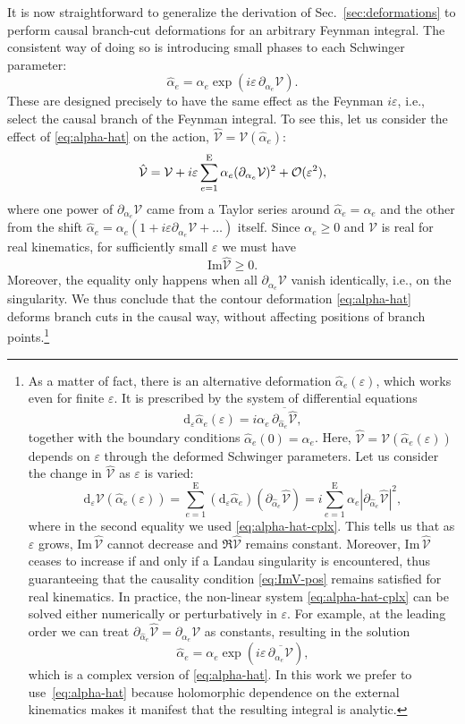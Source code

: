 \documentclass[12pt]{article}
\numberwithin{figure}{section}
\def \be {\begin{equation}}
\def \ee {\end{equation}}
\def \E {\mathrm{E}}
\def \d {\mathrm{d}}
\def \eps {\varepsilon}
\def \V {\mathcal{V}}
\def \geq {\geqslant}
\def \Im {\mathrm{Im}}
\begin{document}
	It is now straightforward to generalize the derivation of Sec.~\ref{sec:deformations} to perform causal branch-cut deformations for an arbitrary Feynman integral. The consistent way of doing so is introducing small phases to each Schwinger parameter:
	\be\label{eq:alpha-hat}
	\hat{\alpha}_e = \alpha_e \exp\left( i\eps\, \partial_{\alpha_e} \V \right).
	\ee
	These are designed precisely to have the same effect as the Feynman $i\eps$, i.e., select the causal branch of the Feynman integral. To see this, let us consider the effect of \eqref{eq:alpha-hat} on the action, $\hat{\V} = \V(\hat{\alpha}_e)$: 
	\be
	\hat{\V} = \V + i\eps \sum_{e=1}^{\E} \alpha_e (\partial_{\alpha_e} \V)^2 + {\cal O}(\eps^2),
	\ee
	where one power of $\partial_{\alpha_e}\V$ came from a Taylor series around $\hat{\alpha}_e = \alpha_e$ and the other from the shift $\hat{\alpha}_e = \alpha_e (1+ i\eps \partial_{\alpha_e} \V + \ldots)$ itself. Since $\alpha_e \geq 0$ and $\V$ is real for real kinematics, for sufficiently small $\eps$ we must have
	\be
	\Im \hat{\V} \geq 0.
	\ee
	Moreover, the equality only happens when all $\partial_{\alpha_e}\V$ vanish identically, i.e., on the singularity. We thus conclude that the contour deformation \eqref{eq:alpha-hat} deforms branch cuts in the causal way, without affecting positions of branch points.\footnote{
	As a matter of fact, there is an alternative deformation $\hat{\alpha}_e(\eps)$, which works even for finite $\eps$. It is prescribed by the system of differential equations
	\be\label{eq:alpha-hat-cplx}
	\d_{\eps} \hat{\alpha}_e(\eps) = i \alpha_e\, \overline{\partial_{\hat{\alpha}_e} \hat{\V}},
	\ee
	together with the boundary conditions $\hat{\alpha}_e(0) = \alpha_e$. Here, $\hat{\V} = \V(\hat{\alpha}_e(\eps))$ depends on $\eps$ through the deformed Schwinger parameters. Let us consider the change in $\hat{\V}$ as $\eps$ is varied:
	\be
	\d_\eps \V(\hat{\alpha}_e(\eps)) = \sum_{e=1}^{\E} (\d_{\eps} \hat{\alpha}_e) (\partial_{\hat{\alpha}_e} \hat{\V}) = i \sum_{e=1}^{\E} \alpha_e |\partial_{\hat{\alpha}_e} \hat{\V}|^2,
	\ee
	where in the second equality we used \eqref{eq:alpha-hat-cplx}. This tells us that as $\eps$ grows, $\Im\, \hat{\V}$ cannot decrease and $\Re \hat{\V}$ remains constant. Moreover, $\Im\, \hat{\V}$ ceases to increase if and only if a Landau singularity is encountered, thus guaranteeing that the causality condition \eqref{eq:ImV-pos} remains satisfied for real kinematics. In practice, the non-linear system \eqref{eq:alpha-hat-cplx} can be solved either numerically or perturbatively in $\eps$. For example, at the leading order we can treat $\partial_{\hat{\alpha}_e} \hat{\V} = \partial_{\alpha_e} \V$ as constants, resulting in the solution
	\be
	\hat{\alpha}_e = \alpha_e \exp \left( i \eps\, \overline{\partial_{\alpha_e} \V} \right),
	\ee
	which is a complex version of \eqref{eq:alpha-hat}.
	In this work we prefer to use~\eqref{eq:alpha-hat} because holomorphic dependence on the external kinematics makes it manifest that the resulting integral is analytic.}
	
\end{document}
